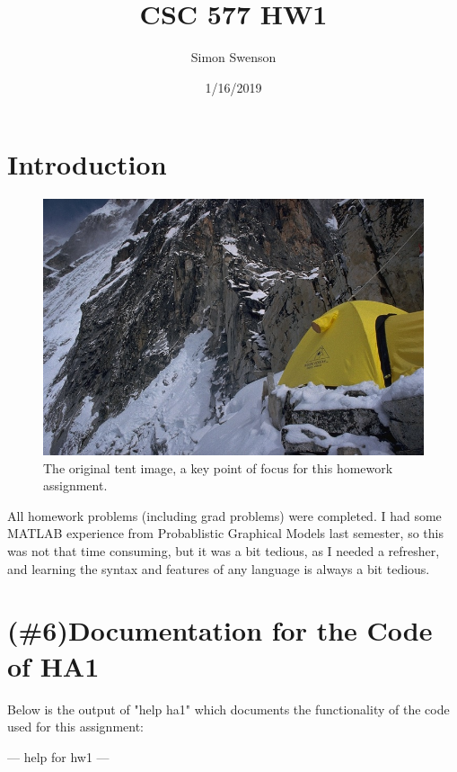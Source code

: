 \documentclass{article}
\title{CSC 577 HW1}
\date{1/16/2019}
\author{Simon Swenson}
\begin{document}
\maketitle
{}

\section{Introduction}

\begin{figure}[!ht]
	\centering
	\includegraphics[width=120mm]{figs/tent.jpg}
	\caption{The original tent image, a key point of focus for this homework 
        assignment.}
\end{figure}

All homework problems (including grad problems) were completed. I had some 
MATLAB experience from Probablistic Graphical Models last semester, so this 
was not that time consuming, but it was a bit tedious, as I needed a refresher, 
and learning the syntax and features of any language is always a bit tedious.

\section{(\#6)Documentation for the Code of HA1}

Below is the output of "help ha1" which documents the functionality of the code 
used for this assignment:

--- help for hw1 ---
\end{document}
